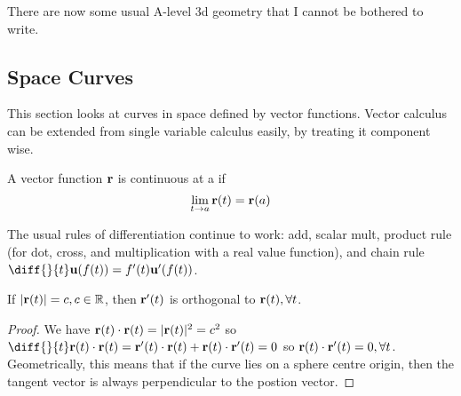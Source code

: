 \documentclass[11pt]{article}
\begin{document}
\begin{proposition}[Affix]
  
\end{proposition}

\begin{problem}
\end{problem}

\begin{definition}
  
\end{definition}

\begin{definition}
  
\end{definition}

There are now some usual A-level 3d geometry that I cannot be bothered to write.

\subsection{Space Curves}

This section looks at curves in space defined by vector functions. Vector calculus can be extended from single variable calculus easily, by treating it component wise.

\begin{definition}[Continuity]
  A vector function \(\bf{r}\) is continuous at a if
  \begin{equation*}
    \lim_{t\to a} \bf{r}(t) = \bf{r}(a)
  \end{equation*}
\end{definition}

\begin{theorem}
  The usual rules of differentiation continue to work: add, scalar mult, product rule (for dot, cross, and multiplication with a real value function), and chain rule \(\diff{}{t} \bf{u} (f(t)) = f'(t) \bf{u}' (f(t))\).
\end{theorem}

\begin{lemma}
  If \(|\bf{r}(t)| = c, c\in \R\), then \(\bf{r}'(t)\) is orthogonal to \(\bf{r}(t), \forall t\).
\end{lemma}
\begin{proof}
  We have \(\bf{r}(t) \cdot \bf{r}(t) = |\bf{r}(t)|^2 = c^2\) so \(\diff{}{t} \bf{r}(t) \cdot \bf{r}(t) = \bf{r}'(t) \cdot \bf{r}(t) + \bf{r}(t) \cdot \bf{r}'(t) = 0\) so \(\bf{r}(t) \cdot \bf{r}'(t) = 0, \forall t\). Geometrically, this means that if the curve lies on a sphere centre origin, then the tangent vector is always perpendicular to the postion vector.
\end{proof}
\end{document}
